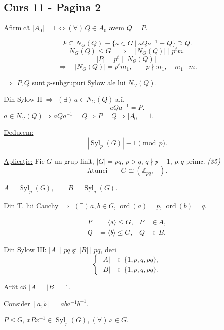 
\subsection*{Curs 11 - Pagina 2}

\noindent Afirm că $|A_0|=1 \Longleftrightarrow
(\forall)\,Q\in A_0$ avem $Q=P$.

\medskip
\[
P\subseteq N_G(Q)=\{a\in G\mid aQa^{-1}=Q\}\supseteq Q.
\]
\[
N_G(Q)\leq G \quad\Longrightarrow\quad |N_G(Q)|\mid p^t m.
\]
\[
|P|=p^t\mid |N_G(Q)|.
\]
\[
\Longrightarrow\quad |N_G(Q)|=p^t m_1,
\qquad p\nmid m_1,\quad m_1\mid m.
\]

\noindent $\Longrightarrow$ $P,Q$ sunt $p$-subgrupuri Sylow ale lui $N_G(Q)$.

\medskip
\noindent Din Sylow II $\Longrightarrow$ $(\exists)\,a\in N_G(Q)$ a.î.
\[
aQa^{-1}=P.
\]
\noindent $a\in N_G(Q) \Longrightarrow aQa^{-1}=Q
\Longrightarrow P=Q \Longrightarrow |A_0|=1$.

\medskip
\noindent\underline{Deducem:}
\[
|\operatorname{Syl}_p(G)|\equiv1\pmod p.
\]

\bigskip
\noindent\underline{Aplicaţie:}
Fie $G$ un grup finit, $|G|=pq$, $p>q$, $q\nmid p-1$,
$p,q$ prime. \textit{(35)}
\[
\text{Atunci}\qquad G\cong (\mathbb{Z}_{pq},+).
\]

\noindent $A=\operatorname{Syl}_p(G),\qquad B=\operatorname{Syl}_q(G)$.

\medskip
\noindent Din T. lui Cauchy $\Longrightarrow$ $(\exists)\,a,b\in G$,
$\operatorname{ord}(a)=p$, $\operatorname{ord}(b)=q$.

\[
\begin{aligned}
P&=\langle a\rangle\leq G, & P&\in A,\\
Q&=\langle b\rangle\leq G, & Q&\in B.
\end{aligned}
\]

\noindent Din Sylow III:
$|A|\mid pq$ şi $|B|\mid pq$, deci
\[
\left\{
\begin{aligned}
|A|&\in\{1,p,q,pq\},\\
|B|&\in\{1,p,q,pq\}.
\end{aligned}
\right.
\]

\noindent Arăt că $|A|=|B|=1$.

\medskip
\noindent Consider $[a,b]=aba^{-1}b^{-1}$.

\medskip
\noindent $P\trianglelefteq G$,\quad
$xPx^{-1}\in\operatorname{Syl}_p(G)$, $(\forall)\,x\in G$.
